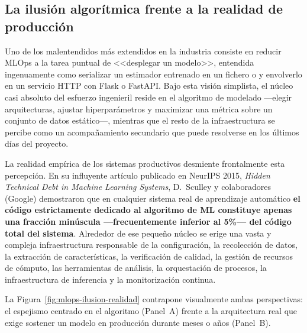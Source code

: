 \subsection{La ilusión algorítmica frente a la realidad de producción}

Uno de los malentendidos más extendidos en la industria consiste en reducir MLOps a la tarea puntual de <<desplegar un modelo>>, entendida ingenuamente como serializar un estimador entrenado en un fichero  o  y envolverlo en un servicio HTTP con Flask o FastAPI. Bajo esta visión simplista, el núcleo casi absoluto del esfuerzo ingenieril reside en el algoritmo de modelado ---elegir arquitecturas, ajustar hiperparámetros y maximizar una métrica sobre un conjunto de datos estático---, mientras que el resto de la infraestructura se percibe como un acompañamiento secundario que puede resolverse en los últimos días del proyecto.

La realidad empírica de los sistemas productivos desmiente frontalmente esta percepción. En su influyente artículo publicado en NeurIPS 2015, \textit{Hidden Technical Debt in Machine Learning Systems}, D.~Sculley y colaboradores (Google) demostraron que en cualquier sistema real de aprendizaje automático \textbf{el código estrictamente dedicado al algoritmo de ML constituye apenas una fracción minúscula ---frecuentemente inferior al 5\%--- del código total del sistema}. Alrededor de ese pequeño núcleo se erige una vasta y compleja infraestructura responsable de la configuración, la recolección de datos, la extracción de características, la verificación de calidad, la gestión de recursos de cómputo, las herramientas de análisis, la orquestación de procesos, la infraestructura de inferencia y la monitorización continua.

La Figura~\ref{fig:mlops-ilusion-realidad} contrapone visualmente ambas perspectivas: el espejismo centrado en el algoritmo (Panel~A) frente a la arquitectura real que exige sostener un modelo en producción durante meses o años (Panel~B).

